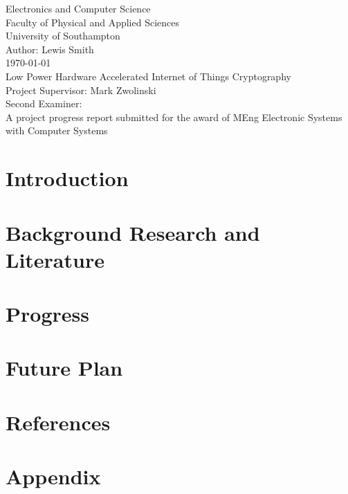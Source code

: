 \documentclass[12pt,twoside,a4paper]{report}
\begin{document}
    
    \begin{titlepage}
    \begin{center}
        \Huge
        Electronics and Computer Science
        \\Faculty of Physical and Applied Sciences
        \\University of Southampton
        \Large
        \\[4cm]Author: Lewis Smith
        \\[1cm]\today
        \\[2cm]Low Power Hardware Accelerated Internet of Things Cryptography
        \\[4cm]Project Supervisor: Mark Zwolinski
        \\Second Examiner:
        \\[4cm]A project progress report submitted for the award of MEng Electronic Systems with Computer Systems
        
    \end{center}
    \end{titlepage}
    
    \begin{abstract}
    
    \lipsum[1-2]
    
    \end{abstract}
    
    \tableofcontents
    
    \chapter{Introduction}
    \lipsum[1-5]
    
    \chapter{Background Research and Literature}
    \lipsum[1-5]
    
    \chapter{Progress}
    \lipsum[1-5]
    
    \chapter{Future Plan}
    \lipsum[1-5]
    
    \chapter*{References}
    
    \chapter*{Appendix}
     
\end{document}
